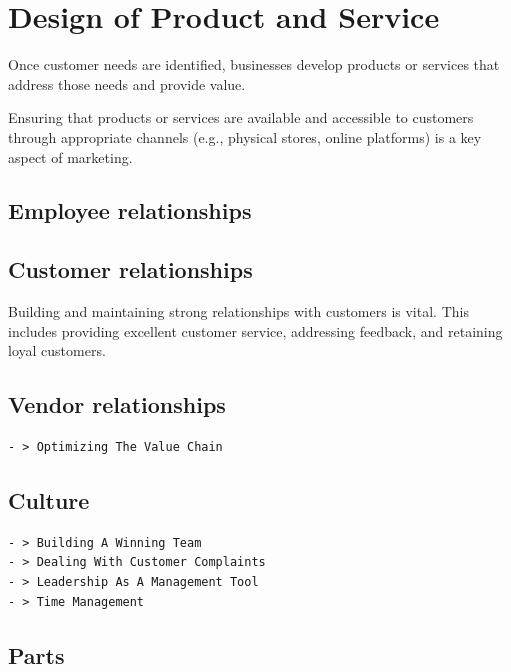 \documentclass[
]{book}
\begin{document}
\hypertarget{design-of-product-and-service}{%
\chapter{Design of Product and Service}\label{design-of-product-and-service}}

Once customer needs are identified, businesses develop products or services that address those needs and provide value.

Ensuring that products or services are available and accessible to customers through appropriate channels (e.g., physical stores, online platforms) is a key aspect of marketing.

\hypertarget{employee-relationships}{%
\section{Employee relationships}\label{employee-relationships}}

\hypertarget{customer-relationships}{%
\section{Customer relationships}\label{customer-relationships}}

Building and maintaining strong relationships with customers is vital. This includes providing excellent customer service, addressing feedback, and retaining loyal customers.

\hypertarget{vendor-relationships}{%
\section{Vendor relationships}\label{vendor-relationships}}

\begin{verbatim}
- > Optimizing The Value Chain
\end{verbatim}

\hypertarget{culture}{%
\section{Culture}\label{culture}}

\begin{verbatim}
- > Building A Winning Team
- > Dealing With Customer Complaints
- > Leadership As A Management Tool
- > Time Management
\end{verbatim}

\hypertarget{parts}{%
\section{Parts}\label{parts}}
\end{document}
